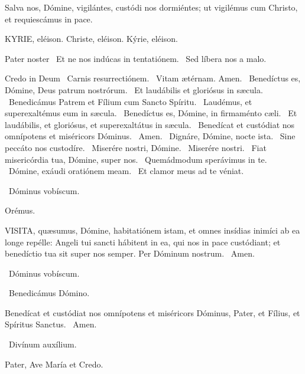  Salva nos, Dómine, vigilántes, custódi nos dormiéntes; ut vigilémus cum Christo, et requiescámus in pace.


KYRIE, eléison. Christe, eléison. Kýrie, eléison.

Pater noster  \V\ Et ne nos indúcas in tentatiónem. \R\ Sed líbera nos a malo.

Credo in Deum  \V\ Carnis resurrectiónem. \R\ Vitam ætérnam. Amen. \V\ Benedíctus es, Dómine, Deus patrum nostrórum. \R\ Et laudábilis et gloriósus in sæcula. \V\ Benedicámus Patrem et Fílium cum Sancto Spíritu. \R\ Laudémus, et superexaltémus eum in sæcula. \V\ Benedíctus es, Dómine, in firmaménto cæli. \R\ Et laudábilis, et gloriósus, et superexaltátus in sæcula. \V\ Benedícat et custódiat nos omnípotens et miséricors Dóminus. \R\ Amen. \V\ Dignáre, Dómine, nocte ista. \R\ Sine peccáto nos custodíre. \V\ Miserére nostri, Dómine. \R\ Miserére nostri. \V\ Fiat misericórdia tua, Dómine, super nos. \R\ Quemádmodum sperávimus in te. \V\ Dómine, exáudi oratiónem meam. \R\ Et clamor meus ad te véniat.

\V\ Dóminus vobíscum.

Orémus. 

\lettrine[lines=2]{V}{ISITA}, quæsumus, Dómine, habitatiónem istam, et omnes insídias inimíci ab ea longe repélle: Angeli tui sancti hábitent in ea, qui nos in pace custódiant; et benedíctio tua sit super nos semper. Per Dóminum nostrum. \R\ Amen.

\V\ Dóminus vobíscum.

\V\ Benedicámus Dómino.

 Benedícat et custódiat nos omnípotens et miséricors Dóminus, Pater, et Fílius, et Spíritus Sanctus. \R\ Amen.


\V\ Divínum auxílium.

Pater, Ave María et Credo.

